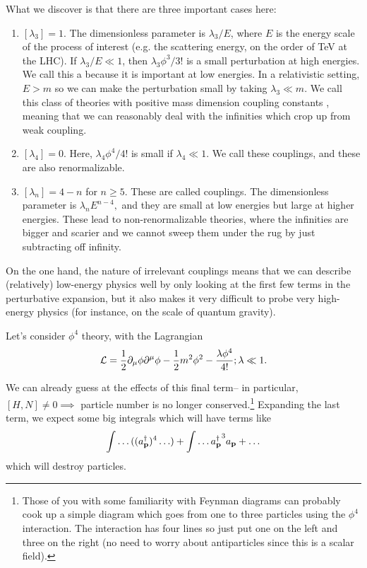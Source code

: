 What we discover is that there are three important cases here:
\begin{enumerate}
    \item $[\lambda_3]=1$. The dimensionless parameter is $\lambda_3/E$, where $E$ is the energy scale of the process of interest (e.g. the scattering energy, on the order of TeV at the LHC). If $\lambda_3/E \ll 1$, then $\lambda_3 \phi^3/3!$ is a small perturbation at high energies. We call this a  because it is important at low  energies. In a relativistic setting, $E>m$ so we can make the perturbation small by taking $\lambda_3\ll m$. We call this class of theories with positive mass dimension coupling constants , meaning that we can reasonably deal with the infinities which crop up from weak coupling.
    \item $[\lambda_4]=0$. Here, $\lambda_4 \phi^4/4!$ is small if $\lambda_4 \ll 1$. We call these  couplings, and these are also renormalizable.
    \item $[\lambda_n]=4-n$ for $n\geq 5$. These are called  couplings. The dimensionless parameter is $\lambda_n E^{n-4},$ and they are small at low energies but large at higher energies. These lead to non-renormalizable theories, where the infinities are bigger and scarier and we cannot sweep them under the rug by just subtracting off infinity.
\end{enumerate}
On the one hand, the nature of irrelevant couplings means that we can describe (relatively) low-energy physics well by only looking at the first few terms in the perturbative expansion, but it also makes it very difficult to probe very high-energy physics (for instance, on the scale of quantum gravity).
\begin{exm}
Let's consider $\phi^4$ theory, with the Lagrangian
$$\mathcal L = \frac{1}{2}\partial_\mu \phi \partial^\mu \phi -\frac{1}{2}m^2\phi^2-\frac{\lambda\phi^4}{4!}; \lambda \ll 1.$$

We can already guess at the effects of this final term-- in particular,
$[H,N]\neq 0\implies$ particle number is no longer conserved.\footnote{Those of you with some familiarity with Feynman diagrams can probably cook up a simple diagram which goes from one to three particles using the $\phi^4$ interaction. The interaction has four lines so just put one on the left and three on the right (no need to worry about antiparticles since this is a scalar field).} Expanding the last term, we expect some big integrals which will have terms like
$$\int \ldots ((a_{\boldsymbol{\mathbf{p}}}^\dagger)^4 \ldots) +\int \ldots {a_{\boldsymbol{\mathbf{p}}}^\dagger}^3 a_{\boldsymbol{\mathbf{p}}}+\ldots$$
which will destroy particles.
\end{exm}

